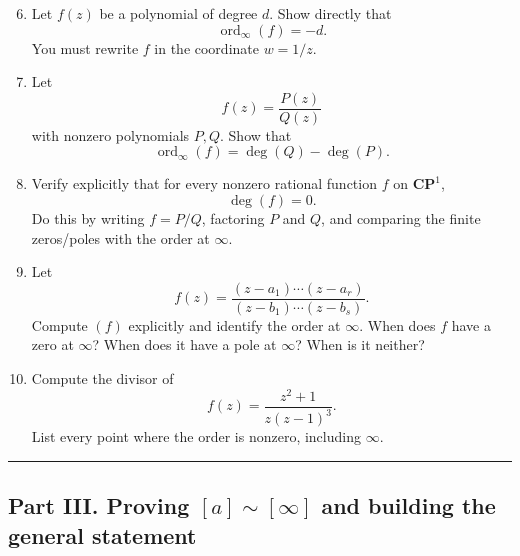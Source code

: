 \documentclass[11pt,openany]{article}
\begin{document}
\begin{enumerate}
	\setcounter{enumi}{5}
	
	\item Let \(f(z)\) be a polynomial of degree \(d\). Show directly that
	\[
	\operatorname{ord}_\infty(f)=-d.
	\]
	You must rewrite \(f\) in the coordinate \(w=1/z\).
	
	\item Let
	\[
	f(z)=\frac{P(z)}{Q(z)}
	\]
	with nonzero polynomials \(P,Q\). Show that
	\[
	\operatorname{ord}_\infty(f)=\deg(Q)-\deg(P).
	\]
	
	\item Verify explicitly that for every nonzero rational function \(f\) on \(\mathbf{CP}^1\),
	\[
	\deg (f)=0.
	\]
	Do this by writing \(f=P/Q\), factoring \(P\) and \(Q\), and comparing the finite zeros/poles with the order at \(\infty\).
	
	\item Let
	\[
	f(z)=\frac{(z-a_1)\cdots(z-a_r)}{(z-b_1)\cdots(z-b_s)}.
	\]
	Compute \((f)\) explicitly and identify the order at \(\infty\).  
	When does \(f\) have a zero at \(\infty\)? When does it have a pole at \(\infty\)? When is it neither?
	
	\item Compute the divisor of
	\[
	f(z)=\frac{z^2+1}{z(z-1)^3}.
	\]
	List every point where the order is nonzero, including \(\infty\).
\end{enumerate}

\bigskip
\hrule
\bigskip

\subsection*{Part III. Proving \texorpdfstring{$[a]\sim[\infty]$}{[a]~[infinity]} and building the general statement}
\end{document}
